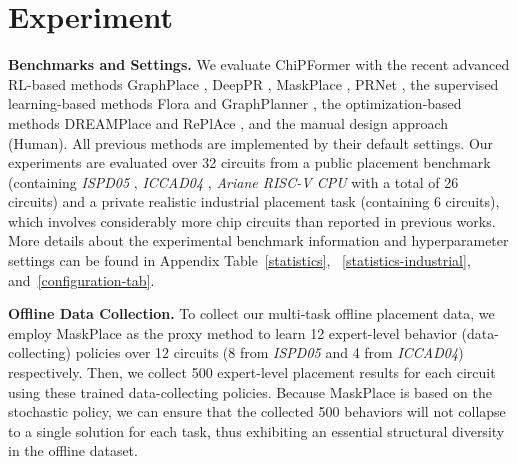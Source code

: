 \documentclass{article}
\theoremstyle{plain}
\theoremstyle{definition}
\theoremstyle{remark}
\begin{document}
\section{Experiment}
\textbf{Benchmarks and Settings.} 
We evaluate ChiPFormer with the recent advanced RL-based methods  GraphPlace \cite{mirhoseini2021graph}, DeepPR \cite{cheng2021joint}, MaskPlace \cite{lai2022maskplace}, PRNet \cite{chengpolicy}, the supervised learning-based methods Flora \cite{liu2022floorplanning} and GraphPlanner \cite{liu2022graphplanner}, the optimization-based methods DREAMPlace \cite{lin2020dreamplace} and RePlAce \cite{cheng2018replace}, and the manual design approach (Human). All previous methods are implemented by their default settings.  Our experiments are evaluated over 32 circuits from a public placement benchmark (containing  \textit{ISPD05} \cite{nam2005ispd2005}, \textit{ICCAD04} \cite{adya2009iccad}, \textit{Ariane RISC-V CPU} \cite{zaruba2019cost} with a total of 26 circuits) and a private realistic industrial placement task (containing 6 circuits), which involves considerably more chip circuits than reported in previous works. 
More details about the experimental benchmark information and hyperparameter settings can be found in 
Appendix Table~\ref{statistics}, ~\ref{statistics-industrial}, and~\ref{configuration-tab}.

\textbf{Offline Data Collection.} 
To collect our multi-task offline placement data, we employ MaskPlace as the proxy method to learn 12 expert-level behavior (data-collecting) policies over 12 circuits (8 from \textit{ISPD05} and 4 from \textit{ICCAD04}) respectively. 
Then, we collect 500 expert-level placement results for each circuit using these trained data-collecting policies.
Because MaskPlace is based on the stochastic policy,
we can ensure that the collected 500 behaviors will not collapse to 
a single solution for each task, 
thus exhibiting an essential structural diversity in the offline dataset.
\end{document}
